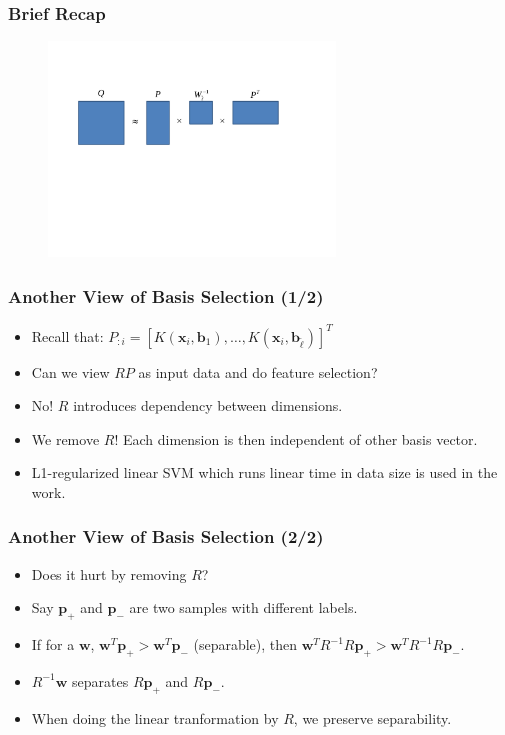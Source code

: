 \documentclass{beamer}
\def\bb{{\boldsymbol b}}
\def\bw{{\boldsymbol w}}
\def\bb{{\boldsymbol b}}
\def\bp{{\boldsymbol p}}
\def\bx{{\boldsymbol x}}
\begin{document}
\begin{frame}
  \frametitle{Brief Recap}
  \begin{figure}
    \includegraphics[width=3in]{nystrom.pdf}
  \end{figure}
\end{frame}

\begin{frame}
  \frametitle{Another View of Basis Selection (1/2)}
  \begin{itemize}
    \item Recall that: $P_{:i} = [K(\bx_i, \bb_1), \dots, K(\bx_i, \bb_{\tilde{\ell}})]^T$
    \item Can we view $RP$ as input data and do feature selection?
    \pause
    \item No! $R$ introduces dependency between dimensions.
    \pause
    \item We remove $R$! Each dimension is then independent of other basis vector.
    \item L1-regularized linear SVM which runs linear time in data size is used in the work.
  \end{itemize}
\end{frame}

\begin{frame}
  \frametitle{Another View of Basis Selection (2/2)}
  \begin{itemize}
    \item Does it hurt by removing $R$?
    \pause
    \item Say $\bp_+$ and $\bp_-$ are two samples with different labels.
    \pause
    \item If for a $\bw$, $\bw^T\bp_+ > \bw^T\bp_-$ (separable), then
    $\bw^TR^{-1}R\bp_+  > \bw^TR^{-1}R\bp_-$.
    \pause
    \item $R^{-1}\bw$ separates $R\bp_+$ and $R\bp_-$.
    \pause
    \item When doing the linear tranformation by $R$, we preserve separability.
  \end{itemize}
\end{frame}
\end{document}
